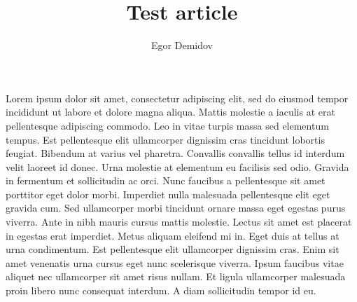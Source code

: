 \documentclass{article}
\title{Test article}
\author{Egor Demidov}
\date{}
\begin{document}
\maketitle

Lorem ipsum dolor sit amet, consectetur adipiscing elit, sed do eiusmod tempor incididunt ut labore et dolore magna aliqua. Mattis molestie a iaculis at erat pellentesque adipiscing commodo. Leo in vitae turpis massa sed elementum tempus. Est pellentesque elit ullamcorper dignissim cras tincidunt lobortis feugiat. Bibendum at varius vel pharetra. Convallis convallis tellus id interdum velit laoreet id donec. Urna molestie at elementum eu facilisis sed odio. Gravida in fermentum et sollicitudin ac orci. Nunc faucibus a pellentesque sit amet porttitor eget dolor morbi. Imperdiet nulla malesuada pellentesque elit eget gravida cum. Sed ullamcorper morbi tincidunt ornare massa eget egestas purus viverra. Ante in nibh mauris cursus mattis molestie. Lectus sit amet est placerat in egestas erat imperdiet. Metus aliquam eleifend mi in. Eget duis at tellus at urna condimentum. Est pellentesque elit ullamcorper dignissim cras. Enim sit amet venenatis urna cursus eget nunc scelerisque viverra. Ipsum faucibus vitae aliquet nec ullamcorper sit amet risus nullam. Et ligula ullamcorper malesuada proin libero nunc consequat interdum. A diam sollicitudin tempor id eu.
\end{document}
